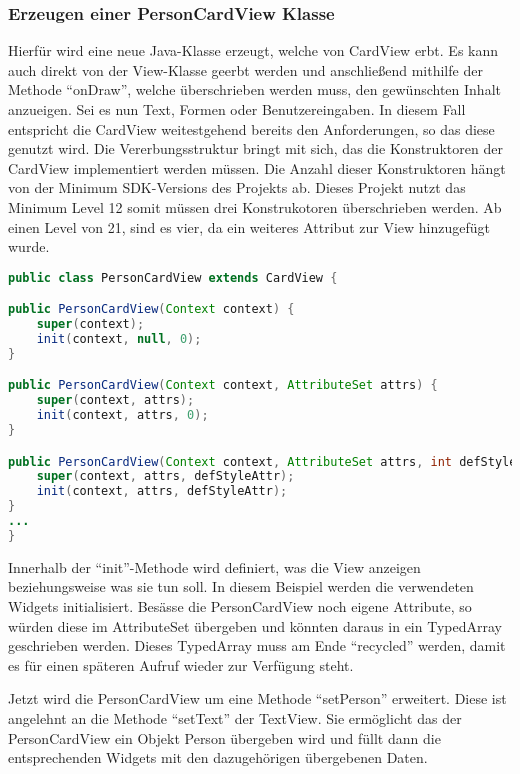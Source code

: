 \subsubsection{Erzeugen einer PersonCardView Klasse}

Hierfür wird eine neue Java-Klasse erzeugt, welche von CardView erbt. Es kann auch direkt von der View-Klasse geerbt werden und anschließend mithilfe der Methode \enquote{onDraw}, welche überschrieben werden muss, den gewünschten Inhalt anzueigen. Sei es nun Text, Formen oder Benutzereingaben.
In diesem Fall entspricht die CardView weitestgehend bereits den Anforderungen, so das diese genutzt wird.
Die Vererbungsstruktur bringt mit sich, das die Konstruktoren der CardView implementiert werden müssen.
Die Anzahl dieser Konstruktoren hängt von der Minimum SDK-Versions des Projekts ab. Dieses Projekt nutzt das Minimum Level 12 somit müssen drei Konstrukotoren überschrieben werden. Ab einen Level von 21, sind es vier, da ein weiteres Attribut zur View hinzugefügt wurde.

\begin{lstlisting}[label=lst:personCardView,
language=java,
firstnumber=1,
caption=Konstruktoren der PersonCardView]				   
public class PersonCardView extends CardView {

public PersonCardView(Context context) {
	super(context);
	init(context, null, 0);
}

public PersonCardView(Context context, AttributeSet attrs) {
	super(context, attrs);
	init(context, attrs, 0);
}

public PersonCardView(Context context, AttributeSet attrs, int defStyleAttr) {
	super(context, attrs, defStyleAttr);
	init(context, attrs, defStyleAttr);
}
...
}
\end{lstlisting}

Innerhalb der \enquote{init}-Methode wird definiert, was die View anzeigen beziehungsweise was sie tun soll. 
In diesem Beispiel werden die verwendeten Widgets initialisiert. Besässe die PersonCardView noch eigene Attribute, so würden diese im AttributeSet übergeben und könnten daraus in ein TypedArray geschrieben werden. Dieses TypedArray muss am Ende \enquote{recycled} werden, damit es für einen späteren Aufruf wieder zur Verfügung steht.

Jetzt wird die PersonCardView um eine Methode \enquote{setPerson} erweitert. Diese ist angelehnt an die Methode \enquote{setText} der TextView. Sie ermöglicht das der PersonCardView ein Objekt Person übergeben wird und füllt dann die entsprechenden Widgets mit den dazugehörigen übergebenen Daten.

